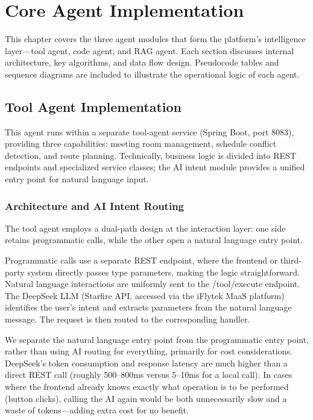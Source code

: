 \section{Core Agent Implementation}

This chapter covers the three agent modules that form the platform's intelligence layer---tool agent, code agent, and RAG agent. Each section discusses internal architecture, key algorithms, and data flow design. Pseudocode tables and sequence diagrams are included to illustrate the operational logic of each agent.

\subsection{Tool Agent Implementation}

This agent runs within a separate tool-agent service (Spring Boot, port 8083), providing three capabilities: meeting room management, schedule conflict detection, and route planning. Technically, business logic is divided into REST endpoints and specialized service classes; the AI intent module provides a unified entry point for natural language input.

\subsubsection{Architecture and AI Intent Routing}

The tool agent employs a dual-path design at the interaction layer: one side retains programmatic calls, while the other open a natural language entry point.

Programmatic calls use a separate REST endpoint, where the frontend or third-party system directly passes type parameters, making the logic straightforward. Natural language interactions are uniformly sent to the /tool/execute endpoint. The DeepSeek LLM (Starfire API, accessed via the iFlytek MaaS platform) identifies the user's intent and extracts parameters from the natural language message. The request is then routed to the corresponding handler.

We separate the natural language entry point from the programmatic entry point, rather than using AI routing for everything, primarily for cost considerations. DeepSeek's token consumption and response latency are much higher than a direct REST call (roughly 500--800ms versus 5--10ms for a local call). In cases where the frontend already knows exactly what operation is to be performed (button clicks), calling the AI again would be both unnecessarily slow and a waste of tokens---adding extra cost for no benefit.

